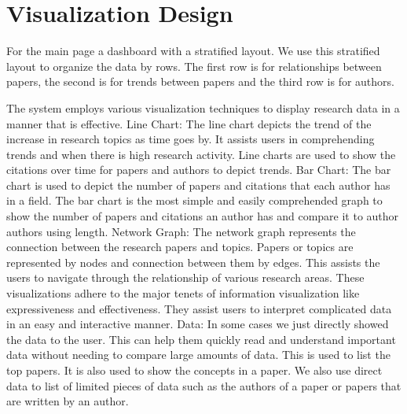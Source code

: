 \documentclass[sigconf]{acmart}
\begin{document}
\section{Visualization Design}
For the main page a dashboard with a stratified layout. We use this stratified layout to organize the data by rows. The first row is for relationships between papers, the second is for trends between papers and the third row is for authors. 


The system employs various visualization techniques to display research data in a manner that is effective.
Line Chart:
The line chart depicts the trend of the increase in research topics as time goes by. It assists users in comprehending trends and when there is high research activity. Line charts are used to show the citations over time for papers and authors to depict trends.
Bar Chart:
The bar chart is used to depict the number of papers and citations that each author has in a field. The bar chart is the most simple and easily comprehended graph to show the number of papers and citations an author has and compare it to author authors using length. 
Network Graph:
The network graph represents the connection between the research papers and topics. Papers or topics are represented by nodes and connection between them by edges. This assists the users to navigate through the relationship of various research areas. These visualizations adhere to the major tenets of information visualization like expressiveness and effectiveness. They assist users to interpret complicated data in an easy and interactive manner.
Data: 
In some cases we just directly showed the data to the user. This can help them quickly read and understand important data without needing to compare large amounts of data. This is used to list the top papers. It is also used to show the concepts in a paper. We also use direct data to list of limited pieces of data such as the authors of a paper or papers that are written by an author.
\end{document}
